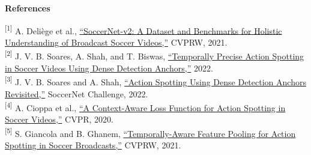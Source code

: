 \documentclass[10pt,a4paper]{article}
\begin{document}
\vspace{1pt}
{\fontsize{7}{8.1}\selectfont
\textbf{References}\par
\textsuperscript{[1]} A. Deli\`ege et al., \href{https://openaccess.thecvf.com/content/CVPR2021W/CVSports/html/Deliege_SoccerNet-v2_A_Dataset_and_Benchmarks_for_Holistic_Understanding_of_Broadcast_CVPRW_2021_paper.html}{``SoccerNet-v2: A Dataset and Benchmarks for Holistic Understanding of Broadcast Soccer Videos,''} CVPRW, 2021.\\
\textsuperscript{[2]} J. V. B. Soares, A. Shah, and T. Biswas, \href{https://arxiv.org/abs/2205.10450}{``Temporally Precise Action Spotting in Soccer Videos Using Dense Detection Anchors,''} 2022.\\
\textsuperscript{[3]} J. V. B. Soares and A. Shah, \href{https://arxiv.org/abs/2206.07846}{``Action Spotting Using Dense Detection Anchors Revisited,''} SoccerNet Challenge, 2022.\\
\textsuperscript{[4]} A. Cioppa et al., \href{https://openaccess.thecvf.com/content_CVPR_2020/html/Cioppa_A_Context-Aware_Loss_Function_for_Action_Spotting_in_Soccer_Videos_CVPR_2020_paper.html}{``A Context-Aware Loss Function for Action Spotting in Soccer Videos,''} CVPR, 2020.\\
\textsuperscript{[5]} S. Giancola and B. Ghanem, \href{https://openaccess.thecvf.com/content/CVPR2021W/CVSports/html/Giancola_Temporally-Aware_Feature_Pooling_for_Action_Spotting_in_Soccer_Broadcasts_CVPRW_2021_paper.html}{``Temporally-Aware Feature Pooling for Action Spotting in Soccer Broadcasts,''} CVPRW, 2021.
}
\end{document}

